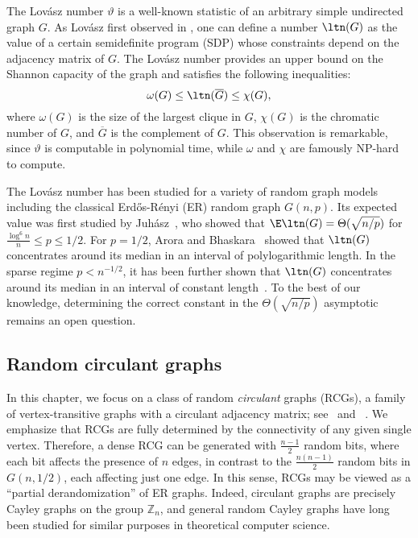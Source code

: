 The Lovász number $\vartheta$ is a well-known statistic of an arbitrary simple undirected graph $G$. 
As Lovász first observed in \cite{lovasz1979shannon}, one can define a number $\ltn(G)$ 
as the value of a certain semidefinite program (SDP) 
whose constraints depend on the adjacency matrix of $G$.
The Lovász number provides an upper bound on the Shannon capacity of the graph and satisfies the following inequalities:
\begin{equation}
\label{eq:theta_ineq}
\omega(G) \leq \ltn(\overline{G}) \leq \chi(G),
\end{equation}
where $\omega(G)$ is the size of the largest clique in $G$, $\chi(G)$ is the chromatic number of $G$, and $\overline{G}$ is the complement of $G$. 
This observation is remarkable, since $\vartheta$ is computable in polynomial time, while $\omega$ and $\chi$ are famously NP-hard to compute. 

The Lovász number has been studied for a variety of random graph models including the classical Erd\H{o}s-R\'{e}nyi (ER) random graph $G(n, p)$. 
Its expected value was first studied by Juh{\'a}sz~\cite{juhasz1982asymptotic}, 
who showed that $\E \ltn(G) = \Theta(\sqrt{n/p})$ for $\frac{\log^6 n}{n} \le p \le 1/2$. 
For $p=1/2$, Arora and Bhaskara~\cite{aroranote} showed that \(\ltn(G)\) concentrates around its median in an interval of polylogarithmic length.
In the sparse regime $p < n^{-1/2}$, it has been further shown that \(\ltn(G)\) concentrates around its median in an interval of constant length~\cite{coja2005lovasz}.
To the best of our knowledge, determining the correct constant in the $\Theta(\sqrt{n/p})$ asymptotic remains an open question. 

\subsection{Random circulant graphs}
In this chapter, we focus on a class of random \emph{circulant} graphs (RCGs), a family of vertex-transitive graphs with a circulant adjacency matrix; see~ and~ . 
We emphasize that RCGs are fully determined by the connectivity of any given single vertex. Therefore, a dense RCG can be generated with \(\frac{n - 1}{2}\) random bits, where each bit affects the presence of \(n\) edges, in contrast to the \(\frac{n(n - 1)}{2}\) random bits in $G(n,1/2)$, each affecting just one edge.
In this sense, RCGs may be viewed as a ``partial derandomization'' of ER graphs.
Indeed, circulant graphs are precisely Cayley graphs on the group \(\mathbb{Z}_n\), and general random Cayley graphs have long been studied for similar purposes in theoretical computer science.


